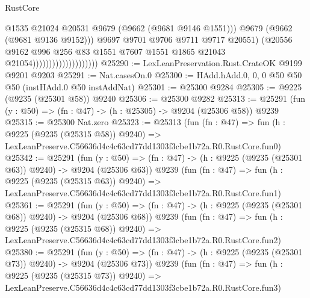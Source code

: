 \begin{lexlean}{RustCore}
\begin{coremodule}
                                                @1535
                                                @21024
                                                @20531
                                                @9679
                                                (@9662 (@9681 @9146 @1551)))
                                              @9679
                                              (@9662 (@9681 @9136 @9152)))
                                            @9697
                                            @9701
                                            @9706
                                            @9711
                                            @9717
                                            @20551)
                                          (@20556
                                            @9162
                                            @996
                                            @256
                                            @83
                                            @1551
                                            @7607
                                            @1551
                                            @1865
                                            @21043
                                            @21054))))))))))))))))))))
@25290 := LexLeanPreservation.Rust.CrateOK @9199 @9201 @9203
@25291 := Nat.casesOn.{0}
@25300 := HAdd.hAdd.{0, 0, 0} @50 @50 @50 (instHAdd.{0} @50 instAddNat)
@25301 := @25300 @9284
@25305 := @9225 (@9235 (@25301 @58)) @9240
@25306 := @25300 @9282
@25313 := @25291 (fun (y : @50) => (fn : @47) -> (h : @25305) -> @9204 (@25306 @58)) @9239
@25315 := @25300 Nat.zero
@25323 := @25313
    (fun (fn : @47) =>
    fun (h : @9225 (@9235 (@25315 @58)) @9240) =>
    LexLeanPreserve.C56636d4c4c63cd77dd1303f3cbe1b72a.R0.RustCore.fun0)
@25342 := @25291
    (fun (y : @50) => (fn : @47) -> (h : @9225 (@9235 (@25301 @63)) @9240) -> @9204 (@25306 @63))
    @9239
    (fun (fn : @47) =>
    fun (h : @9225 (@9235 (@25315 @63)) @9240) =>
    LexLeanPreserve.C56636d4c4c63cd77dd1303f3cbe1b72a.R0.RustCore.fun1)
@25361 := @25291
    (fun (y : @50) => (fn : @47) -> (h : @9225 (@9235 (@25301 @68)) @9240) -> @9204 (@25306 @68))
    @9239
    (fun (fn : @47) =>
    fun (h : @9225 (@9235 (@25315 @68)) @9240) =>
    LexLeanPreserve.C56636d4c4c63cd77dd1303f3cbe1b72a.R0.RustCore.fun2)
@25380 := @25291
    (fun (y : @50) => (fn : @47) -> (h : @9225 (@9235 (@25301 @73)) @9240) -> @9204 (@25306 @73))
    @9239
    (fun (fn : @47) =>
    fun (h : @9225 (@9235 (@25315 @73)) @9240) =>
    LexLeanPreserve.C56636d4c4c63cd77dd1303f3cbe1b72a.R0.RustCore.fun3)

\end{coremodule}
\end{lexlean}
